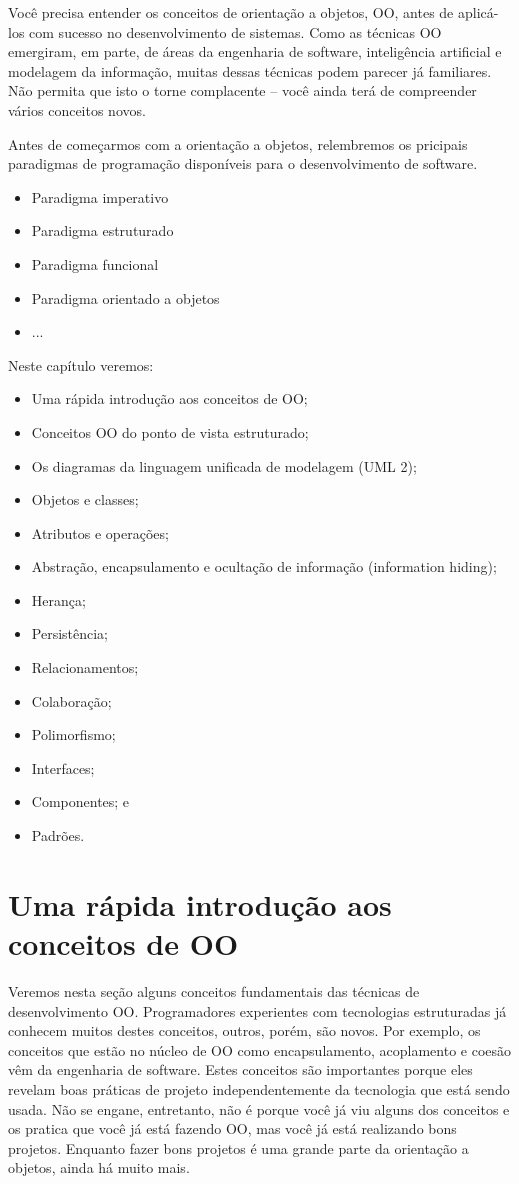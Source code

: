 Você precisa entender os conceitos de orientação a objetos, OO, antes de aplicá-los com sucesso no desenvolvimento de sistemas. Como as técnicas OO emergiram, em parte, de áreas da engenharia de software, inteligência artificial e modelagem da informação, muitas dessas técnicas podem parecer já familiares. Não permita que isto o torne complacente -- você ainda terá de compreender vários conceitos novos.

Antes de começarmos com a orientação a objetos, relembremos os pricipais paradigmas de programação disponíveis para o desenvolvimento de software.
\begin{itemize}
\item Paradigma imperativo
\item Paradigma estruturado
\item Paradigma funcional
\item Paradigma orientado a objetos
\item ...
\end{itemize}

Neste capítulo veremos:

\begin{itemize}
\item Uma rápida introdução aos conceitos de OO;
\item Conceitos OO do ponto de vista estruturado;
\item Os diagramas da linguagem unificada de modelagem (UML 2);
\item Objetos e classes;
\item Atributos e operações;
\item Abstração, encapsulamento e ocultação de informação (information hiding);
\item Herança;
\item Persistência;
\item Relacionamentos;
\item Colaboração;
\item Polimorfismo;
\item Interfaces;
\item Componentes; e
\item Padrões.
\end{itemize}

\section{Uma rápida introdução aos conceitos de OO}

Veremos nesta seção alguns conceitos fundamentais das técnicas de desenvolvimento OO. Programadores experientes com tecnologias estruturadas já conhecem muitos destes conceitos, outros, porém, são novos. Por exemplo, os conceitos que estão no núcleo de OO como encapsulamento, acoplamento e coesão vêm da engenharia de software. Estes conceitos são importantes porque eles revelam boas práticas de projeto independentemente da tecnologia que está sendo usada. Não se engane, entretanto, não é porque você já viu alguns dos conceitos e os pratica que você já está fazendo OO, mas você já está realizando bons projetos. Enquanto fazer bons projetos é uma grande parte da orientação a objetos, ainda há muito mais.

